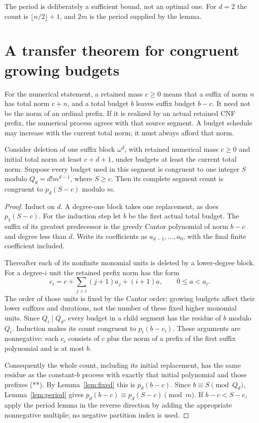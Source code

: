 The period is deliberately a sufficient bound, not an optimal one.
For $d=2$ the count is $\lfloor n/2\rfloor+1$, and $2m$
is the period supplied by the lemma.

\section{A transfer theorem for congruent growing budgets}

For the numerical statement, a retained mass $c\ge0$ means that a
suffix of norm $n$ has total norm $c+n$, and a total budget $b$ leaves
suffix budget $b-c$. It need not be the norm of an ordinal prefix.
If it is realized by an actual retained CNF prefix, the numerical
process agrees with that source segment. A budget schedule may increase
with the current total norm; it must always afford that norm.

\begin{theorem}\label{thm:transfer}
Consider deletion of one suffix block $\omega^d$, with retained
numerical mass $c\ge0$ and initial total norm at least $c+d+1$,
under budgets at least the current total norm. Suppose
every budget used in this segment is congruent to one integer $S$
modulo $Q_d=d!m^{d-1}$, where $S\ge c$. Then its complete segment
count is congruent to $p_d(S-c)$ modulo $m$.
\end{theorem}
\begin{proof}
Induct on $d$. A degree-one block takes one replacement, as does
$p_1(S-c)$. For the induction step let $b$ be the first actual
total budget. The suffix of its greatest predecessor is the greedy
Cantor polynomial of norm $b-c$ and degree less than $d$.
Write its coefficients as $a_{d-1},\ldots,a_0$, with the final
finite coefficient included.

Thereafter each of its nonfinite monomial units is deleted by a
lower-degree block. For a degree-$i$ unit the retained prefix norm
has the form
\[
 c_i=c+\sum_{j>i}(j+1)a_j+(i+1)a,\qquad 0\le a<a_i.
 \tag{**}
\]
The order of those units is fixed by the Cantor order; growing
budgets affect their lower suffixes and durations, not the number
of these fixed higher monomial units. Since $Q_i\mid Q_d$, every
budget in a child segment has the residue of $b$ modulo $Q_i$.
Induction makes its count congruent to $p_i(b-c_i)$.
These arguments are nonnegative: each $c_i$ consists of $c$ plus
the norm of a prefix of the first suffix polynomial and is at most $b$.

Consequently the whole count, including its initial replacement,
has the same residue as the constant-$b$ process with exactly that
initial polynomial and those prefixes (**). By
Lemma~\ref{lem:fixed} this is $p_d(b-c)$.
Since $b\equiv S\pmod {Q_d}$, Lemma~\ref{lem:period} gives
$p_d(b-c)\equiv p_d(S-c)\pmod m$. If $b-c<S-c$,
apply the period lemma in the reverse direction by adding the
appropriate nonnegative multiple; no negative partition index is used.
\end{proof}

